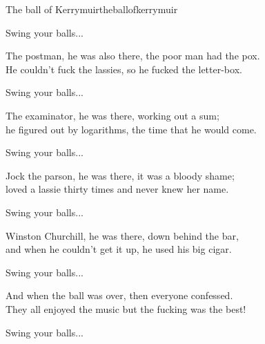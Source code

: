 \begin{song}{The ball of Kerrymuir}{theballofkerrymuir}
\begin{vers}
\end{vers}
\begin{vers}
Swing your balls...\\
\end{vers}
\begin{vers}
The postman, he was also there, the poor man had the pox.\\
He couldn't fuck the lassies, so he fucked the letter-box.\\
\end{vers}
\begin{vers}
Swing your balls...\\
\end{vers}
\begin{vers}
The examinator, he was there, working out a sum;\\
he figured out by logarithms, the time that he would come.\\
\end{vers}
\begin{vers}
Swing your balls...\\
\end{vers}
\begin{vers}
Jock the parson, he was there, it was a bloody shame;\\
loved a lassie thirty times and never knew her name.\\
\end{vers}
\begin{vers}
Swing your balls...\\
\end{vers}
\begin{vers}
Winston Churchill, he was there, down behind the bar,\\
and when he couldn't get it up, he used his big cigar.\\
\end{vers}
\begin{vers}
Swing your balls...\\
\end{vers}
\begin{vers}
And when the ball was over, then everyone confessed.\\
They all enjoyed the music but the fucking was the best!\\
\end{vers}
\begin{vers}
Swing your balls...\\
\end{vers}
\end{song}
